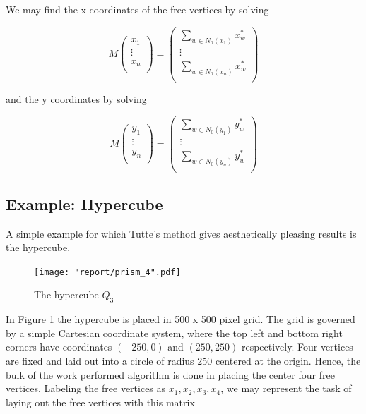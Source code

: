 \documentclass[11pt]{report}
\begin{document}
We may find the x coordinates of the free vertices by solving

\begin{equation}\label{eqn:barycenter_matrix_x}
    M \begin{pmatrix}
        x_1 \\ \vdots \\ x_n \\
    \end{pmatrix} =
    \begin{pmatrix}
        \sum_{w \in N_0(x_1)} x^*_w \\
        \vdots \\
        \sum_{w \in N_0(x_n)} x^*_w \\
    \end{pmatrix}
\end{equation}

and the y coordinates by solving

\begin{equation}\label{eqn:barycenter_matrix_y}
    M \begin{pmatrix}
       y_1 \\ \vdots \\ y_n \\
    \end{pmatrix} =
    \begin{pmatrix}
        \sum_{w \in N_0(y_1)} y^*_w \\
        \vdots \\
        \sum_{w \in N_0(y_n)} y^*_w \\
    \end{pmatrix}
\end{equation}

\subsection{Example: Hypercube}
A simple example for which Tutte's method gives aesthetically pleasing results is the hypercube.

\begin{figure}[H]
    \centering
    \texttt{[image: "report/prism\_4".pdf]}
    \caption{The hypercube $Q_3$}
    \label{fig:hypercube}
\end{figure}

In Figure \ref{fig:hypercube} the hypercube is placed in 500 x 500 pixel grid. The grid is governed by a simple Cartesian coordinate system, where the top left and bottom right corners have coordinates $(-250, 0)$ and $(250, 250)$ respectively. Four vertices are fixed and laid out into a circle of radius 250 centered at the origin. Hence, the bulk of the work performed algorithm is done in placing the center four free vertices. Labeling the free vertices as $x_1, x_2, x_3, x_4$, we may represent the task of laying out the free vertices with this matrix
\end{document}
